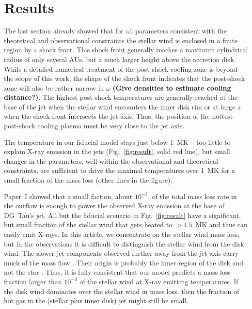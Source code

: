 \section{Results}
\label{sect:results}
The last section already showed that for all parameters consistent with the theoretical and observational constraints the stellar wind is enclosed in a finite region by a shock front. This shock front generally reaches a maximum cylindrical radius of only several AUs, but a much larger height above the accretion disk. While a detailed numerical treatment of the post-shock cooling zone is beyond the scope of this work, the shape of the shock front indicates that the post-shock zone will also be rather narrow in $\omega$ \textbf{(Give densities to estimate cooling distance?)}. The highest post-shock temperatures are generally reached at the base of the jet when the stellar wind encounters the inner disk rim or at large $z$ when the shock front intersects the jet axis. Thus, the position of the hottest post-shock cooling plasma must be very close to the jet axis. 

The temperature in our fiducial model stays just below 1~MK -- too little to explain X-ray emission in the jets (Fig.~\ref{fig:result}, solid red line), but small changes in the parameters, well within the observational and theoretical constraints, are sufficient to drive the maximal temperatures over 1~MK for a small fraction of the mass loss (other lines in the figure). 

Paper~I showed that a small faction, about $10^{-3}$, of the total mass loss rate in the outflow is enough to power the observed X-ray emission at the base of DG~Tau's jet. All but the fiducial scenario in Fig.~\ref{fig:result} have a significant, but small fraction of the stellar wind that gets heated to $>1.5$~MK and thus can easily emit X-rays. In this article, we concentrate on the stellar wind mass loss, but in the observations it is difficult to distinguish the stellar wind from the disk wind. The slower jet components observed further away from the jet axis carry much of the mass flow \citep{2000ApJ...537L..49B}. Their origin is probably the inner region of the disk and not the star \citep{2003ApJ...590L.107A}. Thus, it is fully consistent that our model predicts a mass loss fraction larger than  $10^{-3}$ of the stellar wind at X-ray emitting temperatures. If the disk wind dominates over the stellar wind in mass loss, then the fraction of hot gas in the (stellar plus inner disk) jet might still be small.